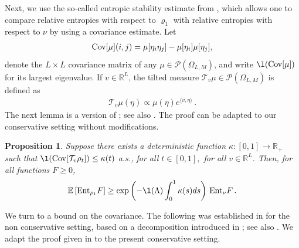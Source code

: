 \documentclass[11pt,reqno]{amsart}
\numberwithin{equation}{section}
\numberwithin{figure}{section}
\newtheorem{proposition}[theorem]{Proposition}
\renewcommand{\leq}{\le}%
\renewcommand{\geq}{\ge} %
\newcommand{\ent}{{\rm Ent}}
\newcommand{\cov}{{\rm Cov}}
\newcommand{\1}{\mathds{1}}
\newcommand{\scalar}[2]{\langle #1 , #2\rangle}
\let\O=\Omega
\let\G=\Gamma
\let\L=\Lambda
\newcommand{\cP}{\ensuremath{\mathcal P}}
\newcommand{\cT}{\ensuremath{\mathcal T}}
\newcommand{\bbE}{{\ensuremath{\mathbb E}} }
\newcommand{\bbR}{{\ensuremath{\mathbb R}} }
\begin{document}
Next,  we use the so-called entropic stability estimate from \cite{chen2022localization}, which allows one to compare relative entropies with respect to $\varrho_1$ with relative entropies with respect to $\nu$ by using a covariance estimate. 
Let 
\begin{align}\label{eq:covtv}
\cov[\mu](i,j) = \mu[\eta_i\eta_j]- \mu[\eta_i]\mu[\eta_j],
\end{align}
denote the $L\times L$ covariance matrix of any  $\mu\in\cP(\O_{L,M})$, and  write $\l(\cov[\mu])$ for its largest eigenvalue. If $v \in \bbR^{L}$, the tilted measure $\mathcal{T}_v\mu\in\cP(\O_{L,M})$ is defined as 
\begin{align}\label{eq:tvnu}
\mathcal{T}_v\mu(\eta) \propto\mu(\eta)e^{\scalar{v}{\eta}}\,.
	\end{align}
The next lemma is a version of \cite[Proposition 39]{chen2022localization}; see also \cite[Lemma 3.2]{caputo2025factorizations}. The proof can be adapted to our conservative setting without modifications.
\begin{proposition}\label{prop:ent_stab}
	Suppose there exists a deterministic function $\kappa:[0,1]\to \bbR_+$ such that  $\l(\cov[\cT_v\rho_t]) \leq \kappa(t)$ a.s., for all $t \in [0,1],$ for all $v\in\bbR^{L}$.
	Then,  for all functions $F\ge 0$,
	\begin{align}
		\bbE\left[\ent_{\rho_1}F\right] \geq %
		\exp\left(-\l(\L)\int_0^1\kappa(s)ds\right)\,\ent_\nu F\,. %
	\end{align}	
\end{proposition}
We turn to a bound on the covariance.  The following was established  %
 in \cite[Lemma 50]{chen2022localization} for the non conservative setting, based on a decomposition introduced in %
 \cite{BB19}; see also \cite[Lemma 3.4]{caputo2025factorizations}. We adapt the proof given in \cite{caputo2025factorizations} to the present conservative setting.
\end{document}
